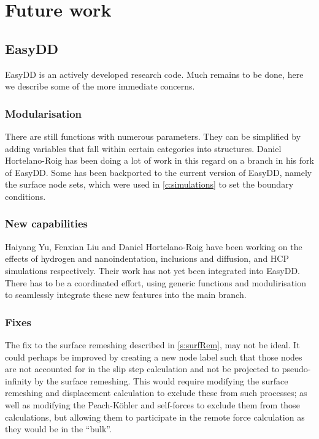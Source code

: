 \chapter{Future work}
\label{c:future}

\section{EasyDD}

EasyDD is an actively developed research code. Much remains to be done, here we describe some of the more immediate concerns.

\subsection{Modularisation}

There are still functions with numerous parameters. They can be simplified by adding variables that fall within certain categories into structures. Daniel Hortelano-Roig has been doing a lot of work in this regard on a branch in his fork of EasyDD. Some has been backported to the current version of EasyDD, namely the surface node sets, which were used in \cref{c:simulations} to set the boundary conditions.

\subsection{New capabilities}

Haiyang Yu, Fenxian Liu and Daniel Hortelano-Roig have been working on the effects of hydrogen and nanoindentation, inclusions and diffusion, and HCP simulations respectively. Their work has not yet been integrated into EasyDD. There has to be a coordinated effort, using generic functions and modulirisation to seamlessly integrate these new features into the main branch.

\subsection{Fixes}

The fix to the surface remeshing described in \cref{s:surfRem}, may not be ideal. It could perhaps be improved by creating a new node label such that those nodes are not accounted for in the slip step calculation and not be projected to pseudo-infinity by the surface remeshing. This would require modifying the surface remeshing and displacement calculation to exclude these from such processes; as well as modifying the Peach-K\"{o}hler and self-forces to exclude them from those calculations, but allowing them to participate in the remote force calculation as they would be in the ``bulk''.

